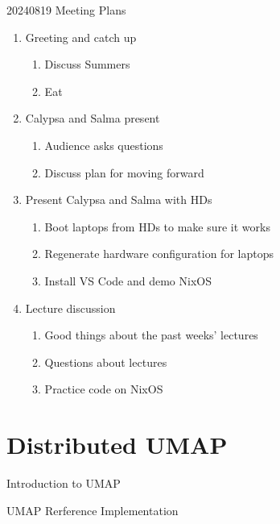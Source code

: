 \documentclass{beamer}
\begin{document}
\begin{frame}{20240819 Meeting Plans}
    \begin{enumerate}
        \item Greeting and catch up
        \begin{enumerate}
            \item Discuss Summers
            \item Eat
        \end{enumerate}
        \item Calypsa and Salma present
        \begin{enumerate}
            \item Audience asks questions
            \item Discuss plan for moving forward
        \end{enumerate}
        \item Present Calypsa and Salma with HDs 
        \begin{enumerate}
            \item Boot laptops from HDs to make sure it works
            \item Regenerate hardware configuration for laptops
            \item Install VS Code and demo NixOS
        \end{enumerate}
        \item Lecture discussion
        \begin{enumerate}
            \item Good things about the past weeks' lectures
            \item Questions about lectures
            \item Practice code on NixOS
        \end{enumerate}
    \end{enumerate}
\end{frame}

\section{Distributed UMAP}

\begin{frame}{Introduction to UMAP}
    
\end{frame}

\begin{frame}{UMAP Rerference Implementation}
    
\end{frame}
\end{document}
